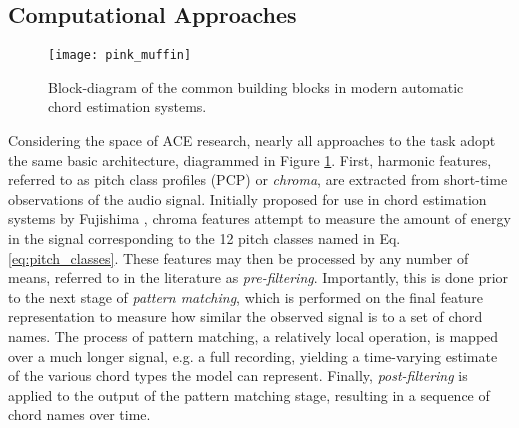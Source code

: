 \subsection{Computational Approaches}
\label{subsec:computational_approaches}

\begin{figure}[t]
\centering
\texttt{[image: pink\_muffin]}
\caption{Block-diagram of the common building blocks in modern automatic chord estimation systems.}
\label{fig:basic_ace}
\end{figure}

Considering the space of ACE research, nearly all approaches to the task adopt the same basic architecture, diagrammed in Figure \ref{fig:basic_ace}.
First, harmonic features, referred to as pitch class profiles (PCP) or \emph{chroma}, are extracted from short-time observations of the audio signal.
Initially proposed for use in chord estimation systems by Fujishima \cite{fujishima1999}, chroma features attempt to measure the amount of energy in the signal corresponding to the 12 pitch classes named in Eq. \ref{eq:pitch_classes}.
These features may then be processed by any number of means, referred to in the literature as \emph{pre-filtering}.
Importantly, this is done prior to the next stage of \emph{pattern matching}, which is performed on the final feature representation to measure how similar the observed signal is to a set of chord names.
The process of pattern matching, a relatively local operation, is mapped over a much longer signal, e.g. a full recording, yielding a time-varying estimate of the various chord types the model can represent.
Finally, \emph{post-filtering} is applied to the output of the pattern matching stage, resulting in a sequence of chord names over time.

